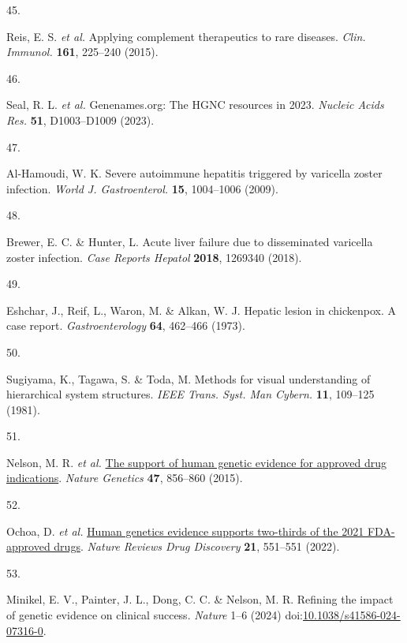 \documentclass[
]{article}
\newlength{\cslhangindent}
\newlength{\csllabelwidth}
\newenvironment{CSLReferences}[2] %
 {\begin{list}{}{%
  \setlength{\itemindent}{0pt}
  \setlength{\leftmargin}{0pt}
  \setlength{\parsep}{0pt}
  \ifodd #1
   \setlength{\leftmargin}{\cslhangindent}
   \setlength{\itemindent}{-1\cslhangindent}
  \fi
  \setlength{\itemsep}{#2\baselineskip}}}
 {\end{list}}
\newcommand{\CSLLeftMargin}[1]{\parbox[t]{\csllabelwidth}{\strut#1\strut}}
\newcommand{\CSLRightInline}[1]{\parbox[t]{\linewidth - \csllabelwidth}{\strut#1\strut}}
\begin{document}
\begin{CSLReferences}{0}{0}
\CSLLeftMargin{45. }%
\CSLRightInline{Reis, E. S. \emph{et al.} Applying complement
therapeutics to rare diseases. \emph{Clin. Immunol.} \textbf{161},
225--240 (2015).}

\CSLLeftMargin{46. }%
\CSLRightInline{Seal, R. L. \emph{et al.} Genenames.org: The {HGNC}
resources in 2023. \emph{Nucleic Acids Res.} \textbf{51}, D1003--D1009
(2023).}

\CSLLeftMargin{47. }%
\CSLRightInline{Al-Hamoudi, W. K. Severe autoimmune hepatitis triggered
by varicella zoster infection. \emph{World J. Gastroenterol.}
\textbf{15}, 1004--1006 (2009).}

\CSLLeftMargin{48. }%
\CSLRightInline{Brewer, E. C. \& Hunter, L. Acute liver failure due to
disseminated varicella zoster infection. \emph{Case Reports Hepatol}
\textbf{2018}, 1269340 (2018).}

\CSLLeftMargin{49. }%
\CSLRightInline{Eshchar, J., Reif, L., Waron, M. \& Alkan, W. J. Hepatic
lesion in chickenpox. A case report. \emph{Gastroenterology}
\textbf{64}, 462--466 (1973).}

\CSLLeftMargin{50. }%
\CSLRightInline{Sugiyama, K., Tagawa, S. \& Toda, M. Methods for visual
understanding of hierarchical system structures. \emph{IEEE Trans. Syst.
Man Cybern.} \textbf{11}, 109--125 (1981).}

\CSLLeftMargin{51. }%
\CSLRightInline{Nelson, M. R. \emph{et al.}
\href{https://doi.org/10.1038/ng.3314}{The support of human genetic
evidence for approved drug indications}. \emph{Nature Genetics}
\textbf{47}, 856--860 (2015).}

\CSLLeftMargin{52. }%
\CSLRightInline{Ochoa, D. \emph{et al.}
\href{https://doi.org/10.1038/d41573-022-00120-3}{Human genetics
evidence supports two-thirds of the 2021 FDA-approved drugs}.
\emph{Nature Reviews Drug Discovery} \textbf{21}, 551--551 (2022).}

\CSLLeftMargin{53. }%
\CSLRightInline{Minikel, E. V., Painter, J. L., Dong, C. C. \& Nelson,
M. R. Refining the impact of genetic evidence on clinical success.
\emph{Nature} 1--6 (2024)
doi:\href{https://doi.org/10.1038/s41586-024-07316-0}{10.1038/s41586-024-07316-0}.}


\end{CSLReferences}
\end{document}
